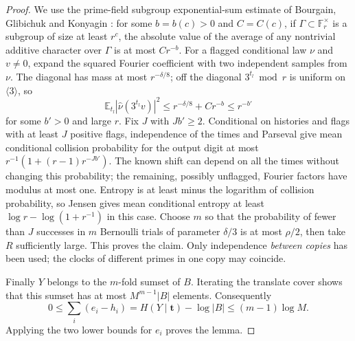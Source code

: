 \begin{proof}
We use the prime-field subgroup exponential-sum estimate of
Bourgain, Glibichuk and Konyagin \cite{BGK}: for some $b=b(c)>0$ and
$C=C(c)$, if $\Gamma\subset\mathbb F_r^\times$ is a subgroup of size
at least $r^c$, the absolute value of the average of any nontrivial
additive character over $\Gamma$ is at most $C r^{-b}$.
For a flagged conditional law $\nu$ and $v\ne0$, expand the squared
Fourier coefficient with two independent samples from $\nu$.
The diagonal has mass at most $r^{-\delta/8}$; off the diagonal
$3^{t_l}\bmod r$ is uniform on $\langle3\rangle$, so
\[
 \mathbb E_{t_l}|\widehat\nu(3^{t_l}v)|^2
 \le r^{-\delta/8}+Cr^{-b}\le r^{-b'}
\]
for some $b'>0$ and large $r$. Fix $J$ with $Jb'\ge2$.
Conditional on histories and flags with at least $J$ positive flags,
independence of the times and Parseval give mean conditional collision
probability for the output digit at most
$r^{-1}(1+(r-1)r^{-Jb'})$. The known shift can depend on all the times
without changing this probability; the remaining, possibly unflagged,
Fourier factors have modulus at most one. Entropy is at least minus the
logarithm of collision probability, so Jensen gives mean conditional
entropy at least $\log r-\log(1+r^{-1})$ in this case. Choose $m$ so that
the probability of fewer than $J$ successes in $m$ Bernoulli trials of
parameter $\delta/3$ is at most $\rho/2$, then take $R$ sufficiently
large. This proves the claim. Only independence \emph{between copies}
has been used; the clocks of different primes in one copy may coincide.

Finally $Y$ belongs to the $m$-fold sumset of $B$. Iterating the
translate cover shows that this sumset has at most $M^{m-1}|B|$
elements. Consequently
\[
 0\le\sum_i(e_i-h_i)=H(Y\mid\boldsymbol t)-\log|B|
 \le (m-1)\log M .
\]
Applying the two lower bounds for $e_i$ proves the lemma.
\end{proof}

